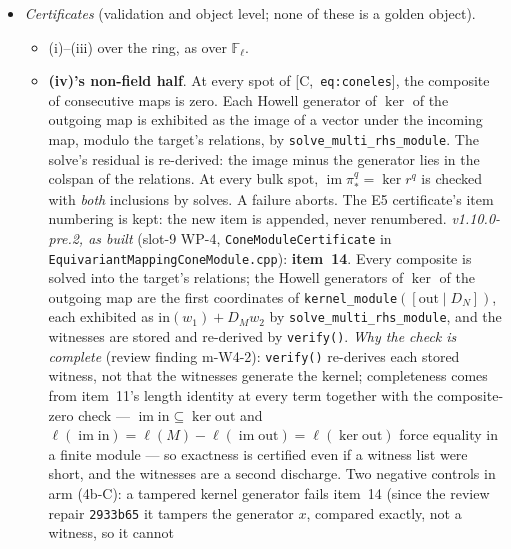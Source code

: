 \documentclass[11pt]{article}
\theoremstyle{remark}
\newcommand{\F}{\mathbb{F}}
\newcommand{\Z}{\mathbb{Z}}
\newcommand{\Fl}{\F_\ell}
\newcommand{\HA}[1]{[C,~\texttt{#1}]}      %
\begin{document}
\begin{itemize}
\begin{itemize}
    \texttt{D\_block}.
  \end{itemize}
  So each of $H^q(\partial)$ and $H^q_c$ over $\Z/\ell^k$ has the cyclic-summand basis of~(c4).
  The three map families $\pi^q_{\ast}$, $r^q$, $\iota^q_{\ast}$ of \HA{eq:coneles}, $T_p^{\partial}$
  and $A_c^{(q)}(T_p)$ are (c5) matrices between those bases.
\item \emph{Certificates} (validation and object level; none of these is a golden object).
  \begin{itemize}
  \item \HA{obl:coneexact}(i)--(iii) over the ring, as over $\Fl$.
  \item \textbf{(iv)'s non-field half}. At every spot of \HA{eq:coneles}, the composite of
    consecutive maps is zero. Each Howell generator of $\ker$ of the outgoing map is exhibited as
    the image of a vector under the incoming map, modulo the target's relations, by
    \texttt{solve\_multi\_rhs\_module}. The solve's residual is re-derived: the image minus the
    generator lies in the colspan of the relations. At every bulk spot,
    $\operatorname{im}\pi^q_{\ast}=\ker r^q$ is checked with \emph{both} inclusions by solves.
    A failure aborts. The E5 certificate's item numbering is kept: the new item is appended,
    never renumbered. \emph{v1.10.0-pre.2, as built} (slot-9 WP-4, \texttt{ConeModuleCertificate}
    in \texttt{EquivariantMappingConeModule.cpp}): \textbf{item~14}. Every composite is solved
    into the target's relations; the Howell generators of $\ker$ of the outgoing map are the
    first coordinates of \texttt{kernel\_module}$([\mathrm{out}\mid D_N])$, each exhibited as
    $\mathrm{in}(w_1)+D_Mw_2$ by \texttt{solve\_multi\_rhs\_module}, and the witnesses are stored and
    re-derived by \texttt{verify()}. \emph{Why the check is complete} (review finding m-W4-2):
    \texttt{verify()} re-derives each stored witness, not that the witnesses generate the kernel;
    completeness comes from item~11's length identity at every term together with the
    composite-zero check --- $\operatorname{im}\mathrm{in}\subseteq\ker\mathrm{out}$ and
    $\ell(\operatorname{im}\mathrm{in})=\ell(M)-\ell(\operatorname{im}\mathrm{out})
    =\ell(\ker\mathrm{out})$ force equality in a finite module --- so exactness is certified even if
    a witness list were short, and the witnesses are a second discharge. Two negative controls in
    arm (4b-C): a tampered kernel generator fails item~14 (since the review repair
    \texttt{2933b65} it tampers the generator $x$, compared exactly, not a witness, so it cannot

\end{itemize}
\end{itemize}
\end{document}
